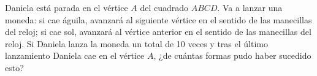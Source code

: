 Daniela está parada en el vértice $A$ del cuadrado $ABCD$. Va a lanzar una moneda: si cae águila, avanzará al siguiente vértice en el sentido de las manecillas del reloj; si cae sol, avanzará al vértice anterior en el sentido de las manecillas del reloj. Si Daniela lanza la moneda un total de 10 veces y tras el último lanzamiento Daniela cae en el vértice $A$, ¿de cuántas formas pudo haber sucedido esto?